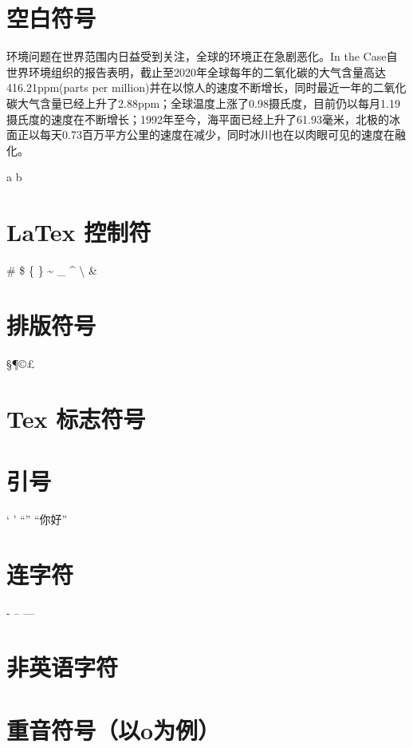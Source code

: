 \documentclass{article}
\begin{document}
    \section{空白符号}
    环境问题在世界范围内日益受到关注，全球的环境正在急剧恶化。In the Case自世界环境组织的报告表明，截止至2020年全球每年的二氧化碳的大气含量高达416.21ppm(parts per million)并在以惊人的速度不断增长，同时最近一年的二氧化碳大气含量已经上升了2.88ppm；全球温度上涨了0.98摄氏度，目前仍以每月1.19摄氏度的速度在不断增长；1992年至今，海平面已经上升了61.93毫米，北极的冰面正以每天0.73百万平方公里的速度在减少，同时冰川也在以肉眼可见的速度在融化。
    
    a \quad b

    \section{LaTex 控制符}
    \# \$ \{ \} \~{} \_{} \^{} \textbackslash
    \&

    \section{排版符号}
    \S \P \dag \ddag \copyright \pounds

    \section{Tex 标志符号}

    \section{引号}
    ` ' ``'' ``你好''
    \section{连字符}
    - -- ---
    \section{非英语字符}
    \section{重音符号（以o为例）}
\end{document}
